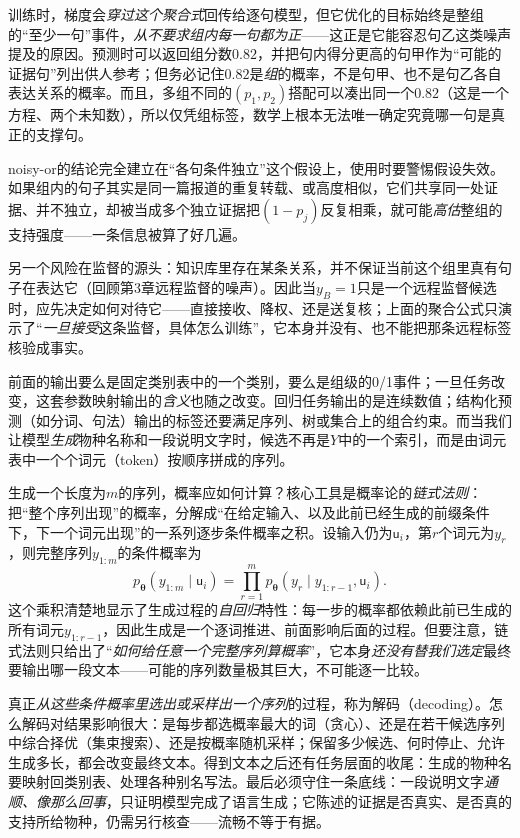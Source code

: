 训练时，梯度会\emph{穿过这个聚合式}回传给逐句模型，但它优化的目标始终是整组的“至少一句”事件，\emph{从不要求组内每一句都为正}——这正是它能容忍句乙这类噪声提及的原因。预测时可以返回组分数$0.82$，并把句内得分更高的句甲作为“可能的证据句”列出供人参考；但务必记住$0.82$是\emph{组}的概率，不是句甲、也不是句乙各自表达关系的概率。而且，多组不同的$(p_1,p_2)$搭配可以凑出同一个$0.82$（这是一个方程、两个未知数），所以仅凭组标签，数学上根本无法唯一确定究竟哪一句是真正的支撑句。

noisy-or的结论完全建立在“各句条件独立”这个假设上，使用时要警惕假设失效。如果组内的句子其实是同一篇报道的重复转载、或高度相似，它们共享同一处证据、并不独立，却被当成多个独立证据把$(1-p_j)$反复相乘，就可能\emph{高估}整组的支持强度——一条信息被算了好几遍。

另一个风险在监督的源头：知识库里存在某条关系，并不保证当前这个组里真有句子在表达它（回顾第3章远程监督的噪声）。因此当$y_B=1$只是一个远程监督候选时，应先决定如何对待它——直接接收、降权、还是送复核；上面的聚合公式只演示了“\emph{一旦接受}这条监督，具体怎么训练”，它本身并没有、也不能把那条远程标签核验成事实。

前面的输出要么是固定类别表中的一个类别，要么是组级的0/1事件；一旦任务改变，这套参数映射输出的\emph{含义}也随之改变。回归任务输出的是连续数值；结构化预测（如分词、句法）输出的标签还要满足序列、树或集合上的组合约束。而当我们让模型\emph{生成}物种名称和一段说明文字时，候选不再是$Y$中的一个索引，而是由词元表中一个个词元（token）按顺序拼成的序列。

生成一个长度为$m$的序列，概率应如何计算？核心工具是概率论的\emph{链式法则}：把“整个序列出现”的概率，分解成“在给定输入、以及此前已经生成的前缀条件下，下一个词元出现”的一系列逐步条件概率之积。设输入仍为$\mathsf{u}_i$，第$r$个词元为$y_r$，则完整序列$y_{1:m}$的条件概率为
\begin{equation}
  p_{\bm{\theta}}(y_{1:m}\mid\mathsf{u}_i)
  =
  \prod_{r=1}^{m}
  p_{\bm{\theta}}(y_r\mid y_{1:r-1},\mathsf{u}_i).
  \label{eq:knowledge-acquisition-direct-generation}
\end{equation}
这个乘积清楚地显示了生成过程的\emph{自回归}特性：每一步的概率都依赖此前已生成的所有词元$y_{1:r-1}$，因此生成是一个逐词推进、前面影响后面的过程。但要注意，链式法则只给出了“\emph{如何给任意一个完整序列算概率}”，它本身\emph{还没有替我们选定}最终要输出哪一段文本——可能的序列数量极其巨大，不可能逐一比较。

真正\emph{从这些条件概率里选出或采样出一个序列}的过程，称为解码（decoding）。怎么解码对结果影响很大：是每步都选概率最大的词（贪心）、还是在若干候选序列中综合择优（集束搜索）、还是按概率随机采样；保留多少候选、何时停止、允许生成多长，都会改变最终文本。得到文本之后还有任务层面的收尾：生成的物种名要映射回类别表、处理各种别名写法。最后必须守住一条底线：一段说明文字\emph{通顺、像那么回事}，只证明模型完成了语言生成；它陈述的证据是否真实、是否真的支持所给物种，仍需另行核查——流畅不等于有据。

